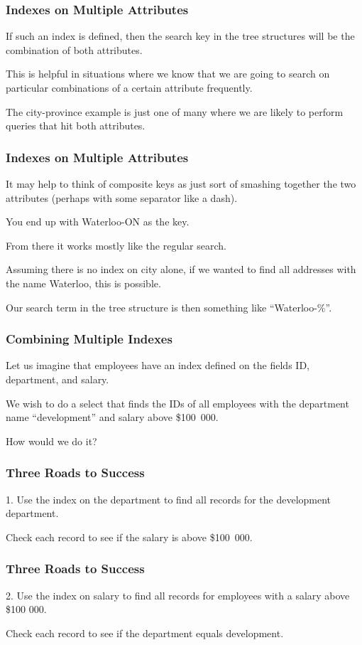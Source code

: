 \begin{frame}
\frametitle{Indexes on Multiple Attributes}

If such an index is defined, then the search key in the tree structures will be the combination of both attributes. 


This is helpful in situations where we know that we are going to search on particular combinations of a certain attribute frequently. 

The city-province example is just one of many where we are likely to perform queries that hit both attributes. 


\end{frame}


\begin{frame}
\frametitle{Indexes on Multiple Attributes}
It may help to think of composite keys as just sort of smashing together the two attributes (perhaps with some separator like a dash).

You end up with Waterloo-ON as the key. 

From there it works mostly like the regular search. 

Assuming there is no index on city alone, if we wanted to find all addresses with the name Waterloo, this is possible. 

Our search term in the tree structure is then something like ``Waterloo-\%''.


\end{frame}

\begin{frame}
\frametitle{Combining Multiple Indexes}

Let us imagine that employees have an index defined on the fields ID, department, and salary. 

We wish to do a select that finds the IDs of all employees with the department name ``development'' and salary above \$100~000. 

How would we do it?

\end{frame}

\begin{frame}
\frametitle{Three Roads to Success}


1. Use the index on the department to find all records for the development department. 

Check each record to see if the salary is above \$100~000.

\end{frame}

\begin{frame}
\frametitle{Three Roads to Success}
2. Use the index on salary to find all records for employees with a salary above \$100 000. 

Check each record to see if the department equals development.

\end{frame}


